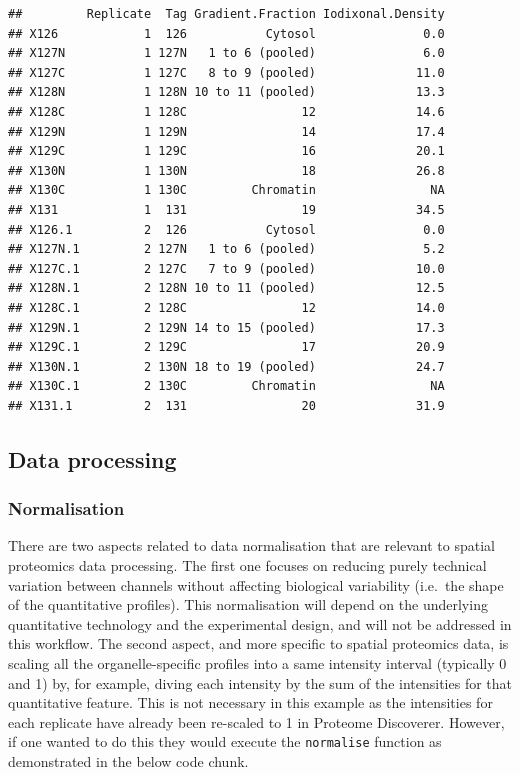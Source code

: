 \begin{verbatim}
##         Replicate  Tag Gradient.Fraction Iodixonal.Density
## X126            1  126           Cytosol               0.0
## X127N           1 127N   1 to 6 (pooled)               6.0
## X127C           1 127C   8 to 9 (pooled)              11.0
## X128N           1 128N 10 to 11 (pooled)              13.3
## X128C           1 128C                12              14.6
## X129N           1 129N                14              17.4
## X129C           1 129C                16              20.1
## X130N           1 130N                18              26.8
## X130C           1 130C         Chromatin                NA
## X131            1  131                19              34.5
## X126.1          2  126           Cytosol               0.0
## X127N.1         2 127N   1 to 6 (pooled)               5.2
## X127C.1         2 127C   7 to 9 (pooled)              10.0
## X128N.1         2 128N 10 to 11 (pooled)              12.5
## X128C.1         2 128C                12              14.0
## X129N.1         2 129N 14 to 15 (pooled)              17.3
## X129C.1         2 129C                17              20.9
## X130N.1         2 130N 18 to 19 (pooled)              24.7
## X130C.1         2 130C         Chromatin                NA
## X131.1          2  131                20              31.9
\end{verbatim}

\subsection{Data processing}\label{data-processing}

\subsubsection{Normalisation}\label{normalisation}

There are two aspects related to data normalisation that are relevant to
spatial proteomics data processing. The first one focuses on reducing
purely technical variation between channels without affecting biological
variability (i.e.~the shape of the quantitative profiles). This
normalisation will depend on the underlying quantitative technology and
the experimental design, and will not be addressed in this workflow. The
second aspect, and more specific to spatial proteomics data, is scaling
all the organelle-specific profiles into a same intensity interval
(typically 0 and 1) by, for example, diving each intensity by the sum of
the intensities for that quantitative feature. This is not necessary in
this example as the intensities for each replicate have already been
re-scaled to 1 in Proteome Discoverer. However, if one wanted to do this
they would execute the \texttt{normalise} function as demonstrated in
the below code chunk.

